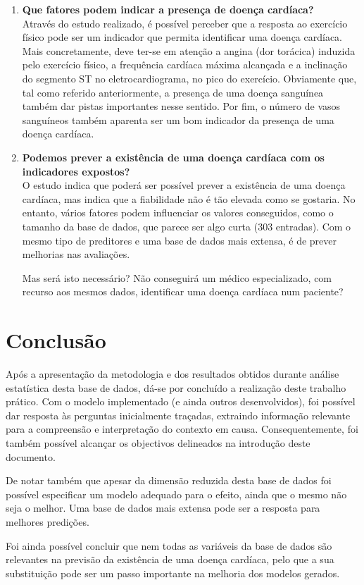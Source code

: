 \documentclass[a4paper]{report}
\begin{document}
{\begin{enumerate}
		\item \textbf{Que fatores podem indicar a presença de doença cardíaca?} \\
		Através do estudo realizado, é possível perceber que a resposta ao exercício físico pode ser um indicador que permita identificar uma doença cardíaca.
		Mais concretamente, deve ter-se em atenção a angina (dor torácica) induzida pelo exercício físico, a frequência cardíaca máxima alcançada e a inclinação do segmento ST no eletrocardiograma, no pico do exercício.
		Obviamente que, tal como referido anteriormente, a presença de uma doença sanguínea também dar pistas importantes nesse sentido.
		Por fim, o número de vasos sanguíneos também aparenta ser um bom indicador da presença de uma doença cardíaca. \\

		\item \textbf{Podemos prever a existência de uma doença cardíaca com os indicadores expostos?} \\
		O estudo indica que poderá ser possível prever a existência de uma doença cardíaca, mas indica que a fiabilidade não é tão elevada como se gostaria.
		No entanto, vários fatores podem influenciar os valores conseguidos, como o tamanho da base de dados, que parece ser algo curta (303 entradas).
		Com o mesmo tipo de preditores e uma base de dados mais extensa, é de prever melhorias nas avaliações.

		Mas será isto necessário? Não conseguirá um médico especializado, com recurso aos mesmos dados, identificar uma doença cardíaca num paciente?
	\end{enumerate}
}

\chapter{Conclusão}
\large{
	Após a apresentação da metodologia e dos resultados obtidos durante análise estatística desta base de dados, dá-se por concluído a realização deste trabalho prático. 
	Com o modelo implementado (e ainda outros desenvolvidos), foi possível dar resposta às perguntas inicialmente traçadas, extraindo informação relevante para a compreensão e interpretação do contexto em causa. 
	Consequentemente, foi também possível alcançar os objectivos delineados na introdução deste documento. 
	
	De notar também que apesar da dimensão reduzida desta base de dados foi possível especificar um modelo adequado para o efeito, ainda que o mesmo não seja o melhor. 
	Uma base de dados mais extensa pode ser a resposta para melhores predições.

	Foi ainda possível concluir que nem todas as variáveis da base de dados são relevantes na previsão da existência de uma doença cardíaca, pelo que a sua substituição pode ser um passo importante na melhoria dos modelos gerados.
}
\end{document}
